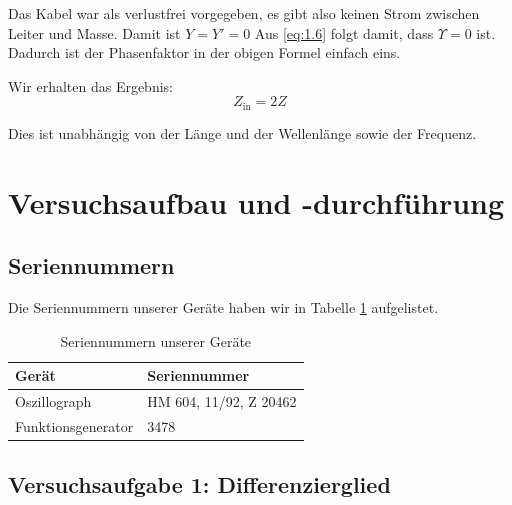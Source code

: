 Das Kabel war als verlustfrei vorgegeben, es gibt also keinen Strom zwischen
Leiter und Masse. Damit ist $Y = Y' = 0$ Aus \eqref{eq:1.6} folgt damit, dass
$\Upsilon = 0$ ist. Dadurch ist der Phasenfaktor in der obigen Formel einfach
eins.

Wir erhalten das Ergebnis:
\[
	Z_\text{in} = 2 Z
\]

Dies ist unabhängig von der Länge und der Wellenlänge sowie der Frequenz.


\section{Versuchsaufbau und -durchführung}

\subsection{Seriennummern}

Die Seriennummern unserer Geräte haben wir in Tabelle \ref{tb:seriennummern}
aufgelistet.

\begin{table}[hb]
	\center
	\caption{Seriennummern unserer Geräte}
	\label{tb:seriennummern}
	\begin{tabular}{ll}
		Gerät & Seriennummer \\
		\hline
		Oszillograph & HM 604, 11/92, Z 20462 \\
		Funktionsgenerator & 3478 \\
	\end{tabular}
\end{table}

\subsection{Versuchsaufgabe 1: Differenzierglied}

